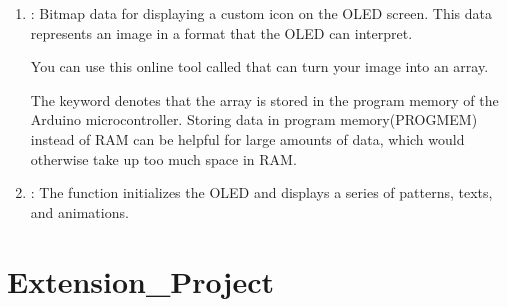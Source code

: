 \documentclass[a4paper,11pt,english]{sphinxmanual}
\begin{document}
\begin{enumerate}
\item {} 
\sphinxAtStartPar
{}:
Bitmap data for displaying a custom icon on the OLED screen. This data represents an image in a format that the OLED can interpret.

\sphinxAtStartPar
You can use this online tool called  that can turn your image into an array.

\sphinxAtStartPar
The  keyword denotes that the array is stored in the program memory of the Arduino microcontroller. Storing data in program memory(PROGMEM) instead of RAM can be helpful for large amounts of data, which would otherwise take up too much space in RAM.

\begin{sphinxVerbatim}[commandchars=\\\{\}]
\PYG{p}{[}\PYG{p}{]}
\end{sphinxVerbatim}

\item {} 
\sphinxAtStartPar
{}:
The  function initializes the OLED and displays a series of patterns, texts, and animations.

\begin{sphinxVerbatim}[commandchars=\\\{\}]
\end{sphinxVerbatim}

\end{enumerate}

\sphinxstepscope


\chapter{Extension\_Project}
\label{\detokenize{Extension_Project/Extension_Project:extension-project}}\label{\detokenize{Extension_Project/Extension_Project::doc}}
\sphinxstepscope
\end{document}
